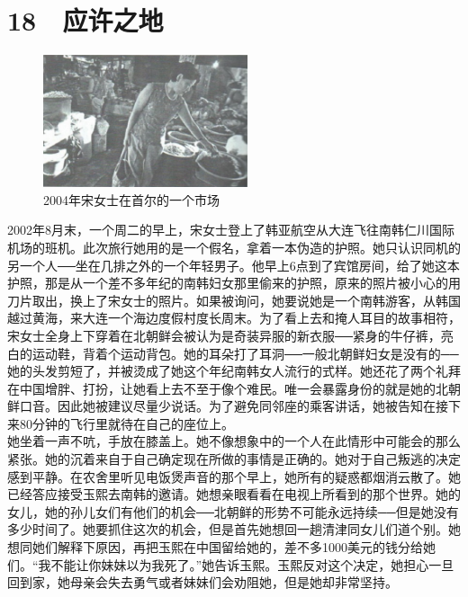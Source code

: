\fancyhead[RO]{{\tiny{\textcolor{Gray}{\FA \ }}}\thepage}
\fancyhead[LE]{{\tiny{\textcolor{Gray}{\FA \ }}}\thepage}
\fancyfoot[LE,RO]{}
\fancyfoot[LO,CE]{}
\fancyfoot[CO,RE]{}
\chapter*{18 {\FA } 应许之地}
\begin{figure}[!htbp]
\centering
\includegraphics[width=6cm]{./Chapters/Images/18.jpg}
\caption*{2004年宋女士在首尔的一个市场}
\end{figure}


2002年8月末，一个周二的早上，宋女士登上了韩亚航空从大连飞往南韩仁川国际机场的班机。此次旅行她用的是一个假名，拿着一本伪造的护照。她只认识同机的另一个人──坐在几排之外的一个年轻男子。他早上6点到了宾馆房间，给了她这本护照，那是从一个差不多年纪的南韩妇女那里偷来的护照，原来的照片被小心的用刀片取出，换上了宋女士的照片。如果被询问，她要说她是一个南韩游客，从韩国越过黄海，来大连一个海边度假村度长周末。为了看上去和掩人耳目的故事相符，宋女士全身上下穿着在北朝鲜会被认为是奇装异服的新衣服──紧身的牛仔裤，亮白的运动鞋，背着个运动背包。她的耳朵打了耳洞──一般北朝鲜妇女是没有的──她的头发剪短了，并被烫成了她这个年纪南韩女人流行的式样。她还花了两个礼拜在中国增胖、打扮，让她看上去不至于像个难民。唯一会暴露身份的就是她的北朝鲜口音。因此她被建议尽量少说话。为了避免同邻座的乘客讲话，她被告知在接下来80分钟的飞行里就待在自己的座位上。\\

她坐着一声不吭，手放在膝盖上。她不像想象中的一个人在此情形中可能会的那么紧张。她的沉着来自于自己确定现在所做的事情是正确的。她对于自己叛逃的决定感到平静。在农舍里听见电饭煲声音的那个早上，她所有的疑惑都烟消云散了。她已经答应接受玉熙去南韩的邀请。她想亲眼看看在电视上所看到的那个世界。她的女儿，她的孙儿女们有他们的机会──北朝鲜的形势不可能永远持续──但是她没有多少时间了。她要抓住这次的机会，但是首先她想回一趟清津同女儿们道个别。她想同她们解释下原因，再把玉熙在中国留给她的，差不多1000美元的钱分给她们。“我不能让你妹妹以为我死了。”她告诉玉熙。玉熙反对这个决定，她担心一旦回到家，她母亲会失去勇气或者妹妹们会劝阻她，但是她却非常坚持。\\

